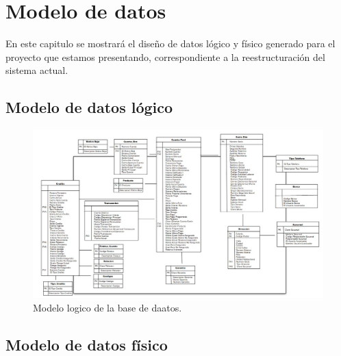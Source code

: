 \chapter{Modelo de datos}
\label{cap:modelo}
En este capitulo se mostrará el diseño de datos lógico y físico generado para el proyecto que estamos presentando, correspondiente a la reestructuración del sistema actual. 

\section{Modelo de datos lógico}
\begin{figure}[htb]
  \begin{center}
    \includegraphics[width=\linewidth]{Modelo_logico.jpg}
        \caption{Modelo logico de la base de daatos.}
    \label{fig:modelo-logico}
  \end{center}
\end{figure}


\section{Modelo de datos físico}

\cleardoublepage


